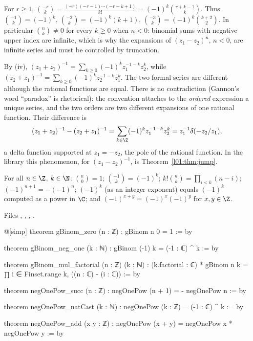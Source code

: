 \begin{example}\label{l01:ex:negbinom}
For $r\ge1$, $\binom{-r}{k} = \frac{(-r)(-r-1)\cdots(-r-k+1)}{k!} = (-1)^k\binom{r+k-1}{k}$. Thus
$\binom{-1}{k} = (-1)^k$, $\binom{-2}{k} = (-1)^k(k+1)$, $\binom{-3}{k} = (-1)^k\binom{k+2}{2}$. In
particular $\binom nk\neq0$ for every $k\ge0$ when $n<0$: binomial sums with negative upper index are
infinite, which is why the expansions of $(z_1-z_2)^{n}$, $n<0$, are infinite series and must be
controlled by truncation.
\end{example}

\begin{example}\label{l01:ex:paradox}
By (iv), $(z_1+z_2)^{-1} = \sum_{k\ge0}(-1)^kz_1^{-1-k}z_2^{k}$, while
$(z_2+z_1)^{-1} = \sum_{k\ge0}(-1)^kz_2^{-1-k}z_1^{k}$. The two formal series are different although the
rational functions are equal. There is no contradiction (Gannon's word ``paradox'' is rhetorical): the
convention attaches to the \emph{ordered} expression a unique series, and the two orders are two different
expansions of one rational function. Their difference is
\begin{equation*}
  (z_1+z_2)^{-1}-(z_2+z_1)^{-1} = \sum_{k\in\Z}(-1)^kz_1^{-1-k}z_2^{k} = z_1^{-1}\delta(-z_2/z_1),
\end{equation*}
a delta function supported at $z_1 = -z_2$, the pole of the rational function. In the library this
phenomenon, for $(z_1-z_2)^{-1}$, is Theorem~\ref{l01:thm:jump}.
\end{example}

\begin{proposition}\label{l01:prop:binomvals}
For all $n\in\Z$, $k\in\N$: $\binom n0 = 1$; $\binom{-1}k = (-1)^k$; $k!\binom nk = \prod_{i<k}(n-i)$;
$(-1)^{n+1} = -(-1)^n$; $(-1)^{k} $ (as an integer exponent) equals $(-1)^k$ computed as a power in $\C$;
and $(-1)^{x+y} = (-1)^x(-1)^y$ for $x,y\in\Z$.
\end{proposition}

\noindent Files ,
,
,
.
\begin{leancode}
@[simp] theorem gBinom_zero (n : ℤ) : gBinom n 0 = 1 := by

theorem gBinom_neg_one (k : ℕ) : gBinom (-1) k = (-1 : ℂ) ^ k := by

theorem gBinom_mul_factorial (n : ℤ) (k : ℕ) :
    (k.factorial : ℂ) * gBinom n k = ∏ i ∈ Finset.range k, ((n : ℂ) - (i : ℂ)) := by

theorem negOnePow_succ (n : ℤ) : negOnePow (n + 1) = - negOnePow n := by

theorem negOnePow_natCast (k : ℕ) : negOnePow (k : ℤ) = (-1 : ℂ) ^ k := by

theorem negOnePow_add (x y : ℤ) : negOnePow (x + y) = negOnePow x * negOnePow y := by
\end{leancode}


